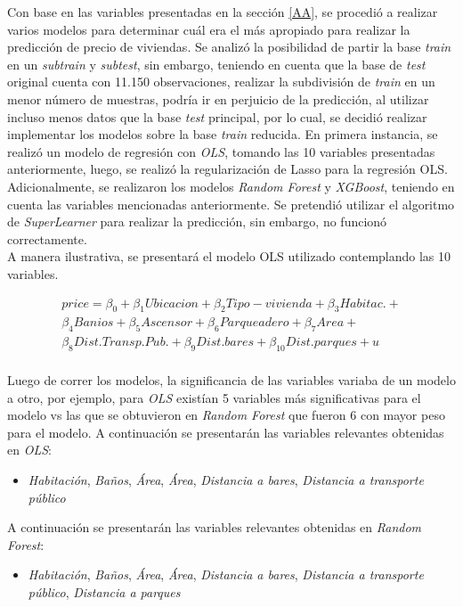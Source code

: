 \documentclass[conference, 10pt]{IEEEtran}
\begin{document}
Con base en las variables presentadas en la sección \ref{AA}, se procedió a realizar varios modelos para determinar cuál era el más apropiado para realizar la predicción de precio de viviendas. Se analizó la posibilidad de partir la base \textit{train} en un \textit{subtrain} y \textit{subtest}, sin embargo, teniendo en cuenta que la base de \textit{test} original cuenta con 11.150 observaciones, realizar la subdivisión de \textit{train} en un menor número de muestras, podría ir en perjuicio de la predicción, al utilizar incluso menos datos que la base \textit{test} principal, por lo cual, se decidió realizar implementar los modelos sobre la base \textit{train} reducida. En primera instancia, se realizó un modelo de regresión con \textit{OLS}, tomando las 10 variables presentadas anteriormente, luego, se realizó la regularización de Lasso para la regresión OLS. Adicionalmente, se realizaron los modelos \textit{Random Forest} y \textit{XGBoost}, teniendo en cuenta las variables mencionadas anteriormente. Se pretendió utilizar el algoritmo de \textit{SuperLearner} para realizar la predicción, sin embargo, no funcionó correctamente.\\
A manera ilustrativa, se presentará el modelo OLS utilizado contemplando las 10 variables.

\begin{multline*}
price= \beta_{0}+\beta_{1}Ubicacion+\beta_{2}Tipo-vivienda+\beta_{3}Habitac.+\\
\beta_{4}Banios+\beta_{5}Ascensor+\beta_{6}Parqueadero+\beta_{7}Area+\\
\beta_{8}Dist.Transp.Pub.+\beta_{9}Dist.bares+\beta_{10}Dist.parques+u \\
\end{multline*}

Luego de correr los modelos, la significancia de las variables variaba de un modelo a otro, por ejemplo, para \textit{OLS} existían 5 variables más significativas para el modelo vs las que se obtuvieron en \textit{Random Forest} que fueron 6 con mayor peso para el modelo. A continuación se presentarán las variables relevantes obtenidas en \textit{OLS}:

\begin{itemize}
\item \textit{Habitación}, \textit{Baños}, \textit{Área}, \textit{Área}, \textit{Distancia a bares}, \textit{Distancia a transporte público} 
\end{itemize}

A continuación se presentarán las variables relevantes obtenidas en \textit{Random Forest}:
\begin{itemize}
\item \textit{Habitación}, \textit{Baños}, \textit{Área}, \textit{Área}, \textit{Distancia a bares}, \textit{Distancia a transporte público},  \textit{Distancia a parques}
\end{itemize}
\end{document}
